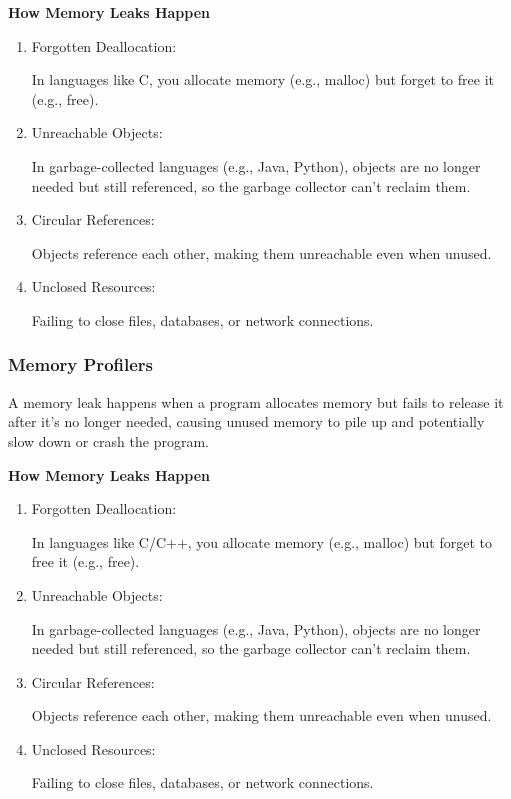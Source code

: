 \documentclass{article}
\begin{document}
\textbf{How Memory Leaks Happen}
\begin{enumerate}
    \item Forgotten Deallocation:

In languages like C, you allocate memory (e.g., malloc) but forget to free it (e.g., free).

\item Unreachable Objects:

In garbage-collected languages (e.g., Java, Python), objects are no longer needed but still referenced, so the garbage collector can’t reclaim them.

\item Circular References:

Objects reference each other, making them unreachable even when unused.

\item Unclosed Resources:

Failing to close files, databases, or network connections.
\end{enumerate}

\subsubsection{Memory Profilers}
A memory leak happens when a program allocates memory but fails to release it after it’s no longer needed, causing unused memory to pile up and potentially slow down or crash the program.


\textbf{How Memory Leaks Happen}
\begin{enumerate}
    \item Forgotten Deallocation:

In languages like C/C++, you allocate memory (e.g., malloc) but forget to free it (e.g., free).

\item Unreachable Objects:

In garbage-collected languages (e.g., Java, Python), objects are no longer needed but still referenced, so the garbage collector can’t reclaim them.

\item Circular References:

Objects reference each other, making them unreachable even when unused.

\item Unclosed Resources:

Failing to close files, databases, or network connections.
\end{enumerate}
\end{document}
